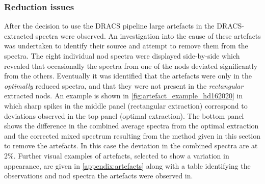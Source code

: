 
\subsubsection{Reduction issues}
\label{subsubsec:reductionartefacts}
After the decision to use the {DRACS} pipeline large artefacts in the {DRACS}-extracted spectra were observed.
An investigation into the cause of these artefacts was undertaken to identify their source and attempt to remove them from the spectra.
The eight individual nod spectra were displayed side-by-side which revealed that occasionally the spectra from one of the nods deviated significantly from the others.
Eventually it was identified that the artefacts were only in the \emph{optimally} reduced spectra, and that they were not present in the \emph{rectangular} extracted nods.
An example is shown in \cref{fig:artefact_example_hd162020} in which sharp spikes in the middle panel (rectangular extraction) correspond to deviations observed in the top panel (optimal extraction).
The bottom panel shows the difference in the combined average spectra from the optimal extraction and the corrected mixed spectrum resulting from the method given in this section to remove the artefacts.
In this case the deviation in the combined spectra are at 2\%.
Further visual examples of artefacts, selected to show a variation in appearance, are given in \cref{appendix:artefacts} along with a table identifying the observations and nod spectra the artefacts were observed in.


